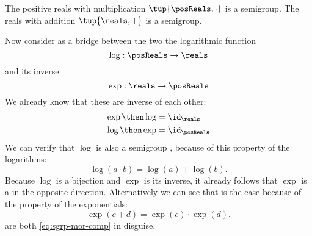 \begin{example}
    The positive reals with multiplication  $\tup{\posReals, \cdot}$ is a semigroup.
    The reals with addition $\tup{\reals, +}$ is a semigroup.

    Now consider as a bridge between the two the logarithmic function
    \begin{equation} \label{eq:log}
        \log :  \posReals \to \reals
    \end{equation}
    and its inverse
    \begin{equation}\label{eq:exp}
        \exp :  \reals \to \posReals
    \end{equation}
    We already know that these are inverse of each other:
    \begin{equation}
    \begin{aligned}
        \exp \then \log &= \id_{\reals} \\
        \log \then \exp &= \id_{\posReals}
        \end{aligned}
    \end{equation}
    We can verify that $\log$ is also a semigroup \whomo, because of this property of the logarithms:
    \begin{equation} \label{eq:log-property}
        \log(a \cdot b) = \log(a) + \log(b).
    \end{equation}
    Because $\log$ is a bijection and $\exp$ is its inverse, it already follows that $\exp$ is
    a \whomo in the opposite direction. Alternatively we can see that is the case because of the property of the exponentials:
    \begin{equation} \label{eq:exp-property}
        \exp(c + d) = \exp(c) \cdot \exp(d).
    \end{equation}
     are both \cref{eq:sgrp-mor-comp} in disguise.
\end{example}

